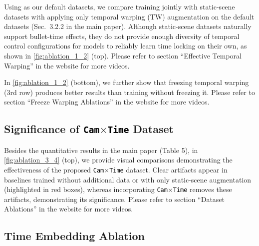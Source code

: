\documentclass[10pt,twocolumn,letterpaper]{article}
\newcommand{\nameCOLOR}[1]{\textcolor{black}{#1}}
\newcommand{\nameDataset}{\nameCOLOR{\mbox{Cam$\times$Time}}\xspace}
\begin{document}

Using \cite{Bai2025,bai2024syncammaster} as our default datasets, we compare training jointly with static-scene datasets \cite{zhou2018stereo,li2019mannequin} with applying only temporal warping (TW) augmentation on the default datasets (Sec.~3.2.2 in the main paper). Although static-scene datasets naturally support bullet-time effects, they do not provide enough diversity of temporal control configurations for models to reliably learn time locking on their own, as shown in \cref{fig:ablation_1_2} (top). Please refer to section ``Effective Temporal Warping'' in the website for more videos.

In \cref{fig:ablation_1_2} (bottom), we further show that freezing temporal warping (3rd row) produces better results than training without freezing it. Please refer to section ``Freeze Warping Ablations'' in the website for more videos. 

\subsection{Significance of \texttt{\nameDataset} Dataset}
Besides the quantitative results in the main paper (Table 5), in \cref{fig:ablation_3_4} (top), we provide visual comparisons demonstrating the effectiveness of the proposed \texttt{\nameDataset} dataset. 
Clear artifacts appear in baselines trained without additional data or with only static-scene augmentation (highlighted in red boxes), whereas incorporating \texttt{\nameDataset} removes these artifacts, demonstrating its significance. Please refer to section ``Dataset Ablations'' in the website for more videos.

\subsection{Time Embedding Ablation}
\end{document}
